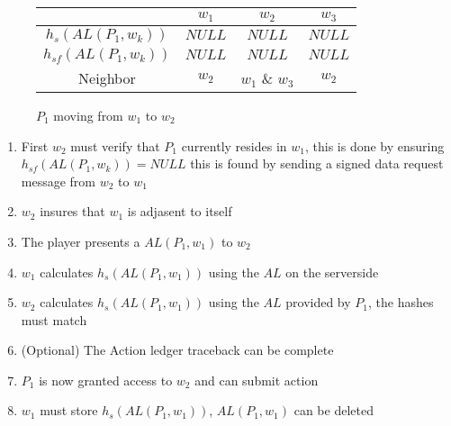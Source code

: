 \documentclass[runningheads,a4paper]{llncs}
\begin{document}
\begin{figure}
\caption{$P_1$ moving from $w_1$ to $w_2$}
\label{w1tow2}
\begin{center}
\end{center}
\begin{center}
\begin{tabular}{ c|c c c }
& $w_1$ & $w_2$ & $w_3$ \\
\hline 
$h_s(AL(P_1,w_k))$ & $NULL$ & $NULL$ & $NULL$ \\ 
$h_{sf}(AL(P_1,w_k))$ & $NULL$ & $NULL$ & $NULL$ \\ 
Neighbor & $w_2$ & $w_1$ \& $w_3$ & $w_2$\\
\end{tabular}
\end{center}
\end{figure}

\begin{enumerate}
\item First $w_2$ must verify that $P_1$ currently resides in $w_1$, this is done by ensuring $h_{sf}(AL(P_1,w_k)) = NULL$ this is found by sending a signed data request message from $w_2$ to $w_1$ 
\item $w_2$ insures that $w_1$ is adjasent to itself
\item The player presents a $AL(P_1,w_1)$ to $w_2$
\item $w_1$ calculates $h_s(AL(P_1,w_1))$ using the $AL$ on the serverside
\item $w_2$ calculates $h_s(AL(P_1,w_1))$ using the $AL$ provided by $P_1$, the hashes must match
\item (Optional) The Action ledger traceback can be complete
\item $P_1$ is now granted access to $w_2$ and can submit action 
\item $w_1$ must store $h_s(AL(P_1,w_1))$, $AL(P_1,w_1)$ can be deleted
\end{enumerate}
\end{document}
